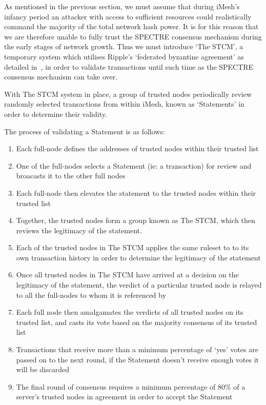 \documentclass[a4paper,10pt,twocolumn]{article}
\begin{document}
As mentioned in the previous section, we must assume that during iMesh's infancy period an attacker with access to sufficient resources 
could realistically command the majority of the total network hash power. It is for this reason that we are therefore unable to fully 
trust the SPECTRE consensus mechanism during the early stages of network growth. Thus we must introduce `The STCM', a temporary 
system which utilises Ripple's `federated byzantine agreement' as detailed in~\cite{ripple}, in order to validate transactions until 
such time as the SPECTRE consensus mechanism can take over.

With The STCM system in place, a group of trusted nodes periodically review randomly selected transactions from within iMesh, known as `Statements' in order to determine their validity.

The process of validating a Statement is as follows:

\vspace{-0.5\baselineskip}
\begin{enumerate}
	\setlength\itemsep{0em}
	\item Each full-node defines the addresses of trusted nodes within their trusted list
	\item One of the full-nodes selects a Statement (ie: a transaction) for review and broacasts it to the other full nodes
	\item Each full-node then elevates the statement to the trusted nodes within their trusted list
	\item Together, the trusted nodes form a group known as The STCM, which then reviews the legitimacy of the statement.
	\item Each of the trusted nodes in The STCM applies the same ruleset to to its own transaction history in order to determine the legitimacy of the statement
	\item Once all trusted nodes in The STCM have arrived at a decision on the legitimacy of the statement, the verdict of a particular trusted node is relayed to all the full-nodes to whom it is referenced by
\item Each full node then amalgamates the verdicts of all trusted nodes on its trusted list, and casts its vote based on the majority consensus of its trusted list
	\item Transactions that receive more than a minimum percentage of `yes' votes are passed on to the next
	round, if the Statement doesn't receive enough votes it will be discarded
	\item The final round of consensus requires a minimum percentage of 80\% of a server's trusted nodes in agreement in order to accept the Statement
\end{enumerate}
\end{document}
